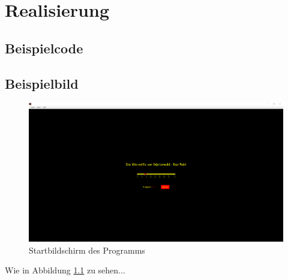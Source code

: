 \chapter{Realisierung}
\Blindtext
\newpage
\section{Beispielcode}
\begin{minipage}{\linewidth}

\end{minipage}
\section{Beispielbild}
\begin{figure}[H]
	\centering
	\includegraphics[width=\textwidth]{sections/examples/appStartScreen.png}
	\caption{Startbildschirm des Programms}
	\label{figure:appStartScreen}
\end{figure}
Wie in Abbildung \ref{figure:appStartScreen} zu sehen...